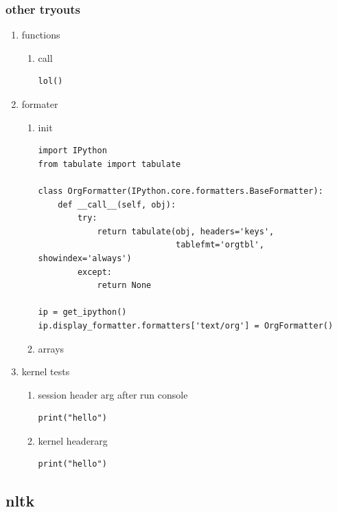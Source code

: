 \documentclass[11pt]{article}
\begin{document}
\subsubsection{other tryouts}
\label{sec:org68be044}
\begin{enumerate}
\item functions
\label{sec:org3222df6}
\begin{enumerate}
\item call
\label{sec:org36bf4af}
\begin{verbatim}
lol()
\end{verbatim}
\end{enumerate}

\item formater
\label{sec:orgc99a5b4}
\begin{enumerate}
\item init
\label{sec:orgeb63773}
\begin{verbatim}
import IPython
from tabulate import tabulate

class OrgFormatter(IPython.core.formatters.BaseFormatter):
    def __call__(self, obj):
        try:
            return tabulate(obj, headers='keys',
                            tablefmt='orgtbl', showindex='always')
        except:
            return None

ip = get_ipython()
ip.display_formatter.formatters['text/org'] = OrgFormatter()
\end{verbatim}
\item arrays
\label{sec:org4829d51}
\end{enumerate}

\item kernel tests
\label{sec:orgdc82a59}
\begin{enumerate}
\item session header arg after run console
\label{sec:orgfbfd1d9}
\begin{verbatim}
print("hello")
\end{verbatim}
\item kernel headerarg
\label{sec:orgbefd295}
\begin{verbatim}
print("hello")
\end{verbatim}
\end{enumerate}
\end{enumerate}
\subsection{nltk}
\label{sec:org833fc1a}
\end{document}
